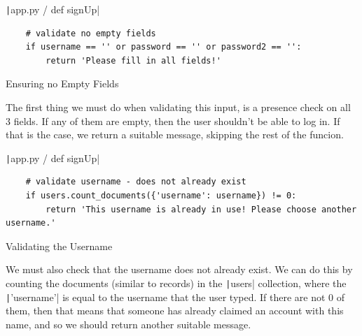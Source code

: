 \documentclass[12pt]{report}
\newcommand{\pil}[1]{\protect\texttt|#1|}
\begin{document}
\begin{center}
\end{center}

\begin{listing}[H]
\pil{app.py / def signUp}
\begin{verbatim}
    # validate no empty fields
    if username == '' or password == '' or password2 == '':
        return 'Please fill in all fields!'
\end{verbatim}
\caption{Ensuring no Empty Fields}\label{cs:noEmptyFields}
\end{listing}

The first thing we must do when validating this input, is a presence check on all 3 fields. If any of them are empty, then the user shouldn't be able to log in. If that is the case, we return a suitable message, skipping the rest of the funcion.

\begin{listing}[H]
\pil{app.py / def signUp}
\begin{verbatim}
    # validate username - does not already exist
    if users.count_documents({'username': username}) != 0:
        return 'This username is already in use! Please choose another username.'
\end{verbatim}
\caption{Validating the Username}\label{cs:validateUsername}
\end{listing}

We must also check that the username does not already exist. We can do this by counting the documents (similar to records) in the \pil{users} collection, where the \pil{'username'} is equal to the username that the user typed. If there are not 0 of them, then that means that someone has already claimed an account with this name, and so we should return another suitable message. 
\end{document}
